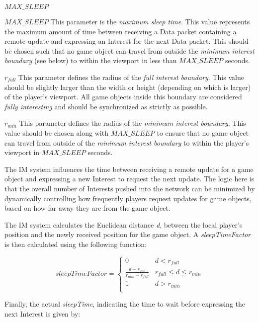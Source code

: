 \begin{labeling}{$MAX\_SLEEP$ }
    \item [$MAX\_SLEEP$] This parameter is the \textit{maximum sleep time}. This value represents the maximum amount of time between receiving a Data packet containing a remote update and expressing an Interest for the next Data packet. This should be chosen such that no game object can travel from outside the \textit{minimum interest boundary} (see below) to within the viewport in less than $MAX\_SLEEP$ seconds. 
    \item [$r_{full}$] This parameter defines the radius of the \textit{full interest boundary}. This value should be slightly larger than the width or height (depending on which is larger) of the player's viewport. All game objects inside this boundary are considered \textit{fully interesting} and should be synchronized as strictly as possible.
    \item [$r_{min}$] This parameter defines the radius of the \textit{minimum interest boundary}. This value should be chosen along with $MAX\_SLEEP$ to ensure that no game object can travel from outside of the \textit{minimum interest boundary} to within the player's viewport in $MAX\_SLEEP$ seconds. 
\end{labeling}
    
The IM system influences the time between receiving a remote update for a game object and expressing a new Interest to request the next update. The logic here is that the overall number of Interests pushed into the network can be minimized by dynamically controlling how frequently players request updates for game objects, based on how far away they are from the game object.

The IM system calculates the Euclidean distance \textit{d}, between the local player's position and the newly received position for the game object. A \textit{sleepTimeFactor} is then calculated using the following function:


\begin{equation}
sleepTimeFactor =
\begin{cases} 
    0 & d < r_{full} \\
    \frac{d - r_{full}}{r_{min} - r_{full}} & r_{full} \leq d \leq r_{min} \\
    1 & d > r_{min} \\
\end{cases}
\end{equation}

Finally, the actual \textit{sleepTime}, indicating the time to wait before expressing the next Interest is given by:

